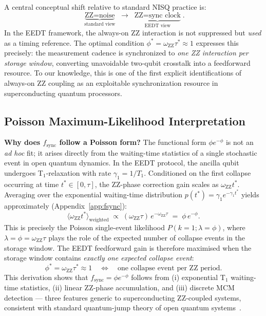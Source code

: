 \documentclass[10pt,twocolumn]{article}
\newcommand{\oZZ}{\omega_{\mathrm{ZZ}}}
\newcommand{\taustar}{\tau^*}
\begin{document}
A central conceptual shift relative to standard NISQ practice is:
\begin{equation}
  \underbrace{\text{ZZ} = \text{noise}}_{\text{standard view}}
  \;\longrightarrow\;
  \underbrace{\text{ZZ} = \text{sync clock}}_{\text{EEDT view}}.
  \label{eq:conceptshift}
\end{equation}
In the EEDT framework, the always-on ZZ interaction is not suppressed
but \emph{used} as a timing reference.
The optimal condition $\phi^* = \oZZ\taustar \approx 1$
expresses this precisely: the measurement cadence is synchronized to
\emph{one ZZ interaction per storage window}, converting unavoidable
two-qubit crosstalk into a feedforward resource.
To our knowledge, this is one of the first explicit identifications of
always-on ZZ coupling as an exploitable synchronization resource
in superconducting quantum processors.

\subsection{Poisson Maximum-Likelihood Interpretation}
\label{subsec:mle}

\textbf{Why does $f_\mathrm{sync}$ follow a Poisson form?}
The functional form $\phi e^{-\phi}$ is not an \textit{ad hoc} fit;
it arises directly from the waiting-time statistics of a single
stochastic event in open quantum dynamics.
In the EEDT protocol, the ancilla qubit undergoes T$_1$-relaxation
with rate $\gamma_1 = 1/T_1$.
Conditioned on the first collapse occurring at time $t^* \in [0,\tau]$,
the ZZ-phase correction gain scales as $\oZZ t^*$.
Averaging over the exponential waiting-time distribution
$p(t^*) = \gamma_1 e^{-\gamma_1 t^*}$ yields approximately (Appendix~\ref{app:fsync}):
\begin{equation}
  \langle \oZZ t^* \rangle_\mathrm{weighted}
  \;\propto\; (\oZZ\tau)\,e^{-\oZZ\tau}
  \;=\; \phi\,e^{-\phi}.
\end{equation}
This is precisely the Poisson single-event likelihood
$P(k{=}1;\lambda{=}\phi)$, where $\lambda = \phi = \oZZ\tau$
plays the role of the expected number of collapse events
in the storage window.
The EEDT feedforward gain is therefore maximised when the storage window
contains \emph{exactly one expected collapse event}:
\begin{equation}
  \phi^* = \oZZ\taustar \approx 1
  \quad\Leftrightarrow\quad
  \text{one collapse event per ZZ period}.
\end{equation}
This derivation shows that $f_\mathrm{sync}=\phi e^{-\phi}$
follows from (i) exponential T$_1$ waiting-time statistics,
(ii) linear ZZ-phase accumulation, and (iii) discrete MCM detection ---
three features generic to superconducting ZZ-coupled systems,
consistent with standard quantum-jump theory of open quantum
systems~\cite{Carmichael1993,Dalibard1992,Breuer2002}.
\end{document}
